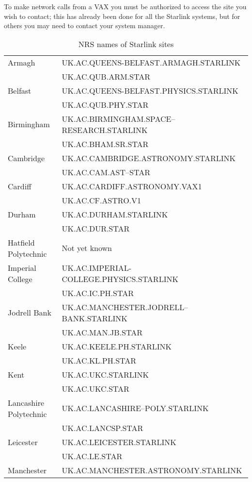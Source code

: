 To make network calls from a VAX you must be authorized to access the site
you wish to contact; this has already been done for all the Starlink
systems, but for others you may need to contact your system manager.

\begin{table}[p]
\caption{NRS names of Starlink sites}\label{nrs}
\small
\begin{center}\begin{tabular}{l@{\hspace{1cm}}l}
Armagh& UK.AC.QUEENS-BELFAST.ARMAGH.STARLINK\\
& UK.AC.QUB.ARM.STAR\\[\medskipamount]
Belfast& UK.AC.QUEENS-BELFAST.PHYSICS.STARLINK\\
& UK.AC.QUB.PHY.STAR\\[\medskipamount]
Birmingham& UK.AC.BIRMINGHAM.SPACE--RESEARCH.STARLINK\\
& UK.AC.BHAM.SR.STAR\\[\medskipamount]
Cambridge& UK.AC.CAMBRIDGE.ASTRONOMY.STARLINK\\
& UK.AC.CAM.AST--STAR\\[\medskipamount]
Cardiff& UK.AC.CARDIFF.ASTRONOMY.VAX1\\
& UK.AC.CF.ASTRO.V1\\[\medskipamount]
Durham& UK.AC.DURHAM.STARLINK\\
& UK.AC.DUR.STAR\\[\medskipamount]
Hatfield Polytechnic & Not yet known \\[\medskipamount]
Imperial College& UK.AC.IMPERIAL-COLLEGE.PHYSICS.STARLINK\\
& UK.AC.IC.PH.STAR\\[\medskipamount]
Jodrell Bank& UK.AC.MANCHESTER.JODRELL--BANK.STARLINK\\
& UK.AC.MAN.JB.STAR\\[\medskipamount]
Keele& UK.AC.KEELE.PH.STARLINK\\
& UK.AC.KL.PH.STAR\\[\medskipamount]
Kent & UK.AC.UKC.STARLINK \\
& UK.AC.UKC.STAR \\[\medskipamount]
Lancashire Polytechnic& UK.AC.LANCASHIRE--POLY.STARLINK\\
& UK.AC.LANCSP.STAR\\[\medskipamount]
Leicester& UK.AC.LEICESTER.STARLINK\\
& UK.AC.LE.STAR\\[\medskipamount]
Manchester& UK.AC.MANCHESTER.ASTRONOMY.STARLINK\\

\end{tabular}
\end{center}
\end{table}
